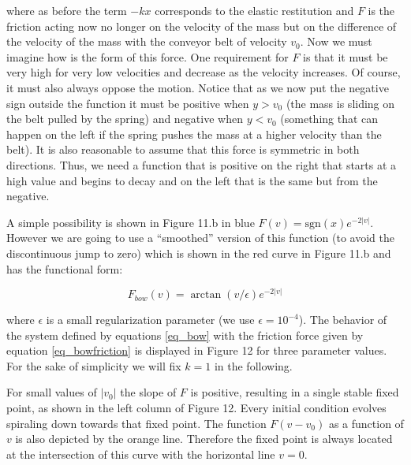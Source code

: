 \documentclass{article}
\begin{document}
where as before the term $-kx$ corresponds to the elastic restitution and $F$ is the friction acting now no longer on the velocity of the mass but on the difference of the velocity of the mass with the conveyor belt of velocity $v_0$. 
Now we must imagine how is the form of this force. 
One requirement for $F$ is that it must be very high for very low velocities and decrease as the velocity increases. 
Of course, it must also always oppose the motion. 
Notice that as we now put the negative sign outside the function it must be positive when $y>v_0$ (the mass is sliding on the belt pulled by the spring) and negative when $y<v_0$ (something that can happen on the left if the spring pushes the mass at a higher velocity than the belt). 
It is also reasonable to assume that this force is symmetric in both directions. 
Thus, we need a function that is positive on the right that starts at a high value and begins to decay and on the left that is the same but from the negative. 

A simple possibility is shown in Figure 11.b in blue $F(v) = \text{sgn}(x) e^{-2|v|}$. 
However we are going to use a “smoothed” version of this function (to avoid the discontinuous jump to zero) which is shown in the red curve in Figure 11.b and has the functional form:

\begin{equation} \label{eq_bowfriction}
    F_{bow}(v) = \arctan(v/\epsilon) e^{-2|v|} 
\end{equation}

where $\epsilon$ is a small regularization parameter (we use $\epsilon = 10^{-4}$).
The behavior of the system defined by equations \ref{eq_bow} with the friction force given by equation \ref{eq_bowfriction} is displayed in Figure 12 for three parameter values. 
For the sake of simplicity we will fix $k=1$ in the following.

For small values of $|v_0|$ the slope of $F$ is positive, resulting in a single stable fixed point, as shown in the left column of Figure 12.
Every initial condition evolves spiraling down towards that fixed point. 
The function $F(v-v_0)$ as a function of $v$ is also depicted by the 
orange line. Therefore the fixed point is always located at the intersection of this curve with the horizontal line $v=0$.
\end{document}

